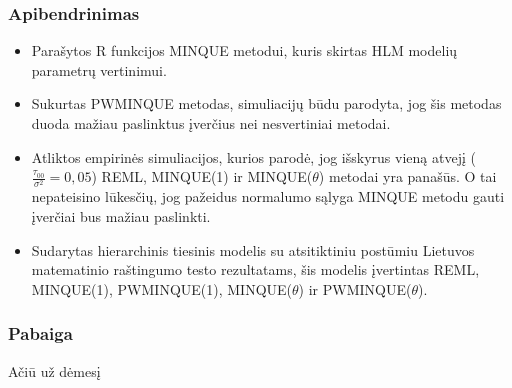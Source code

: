 \documentclass[utf8,hyperref={unicode,pdftex}]{beamer}
\begin{document}
\begin{frame}
\frametitle{Apibendrinimas}

\begin{itemize}
\item Parašytos R funkcijos MINQUE metodui, kuris skirtas HLM modelių parametrų vertinimui.
\item Sukurtas PWMINQUE metodas, simuliacijų būdu parodyta, jog šis metodas duoda mažiau paslinktus įverčius nei nesvertiniai metodai.
\item Atliktos empirinės simuliacijos, kurios parodė, jog išskyrus vieną atvejį ($\frac{\tau_{00}}{\sigma^2}=0,05$) REML, MINQUE(1) ir MINQUE($\theta$) metodai yra panašūs. O tai nepateisino lūkesčių, jog pažeidus normalumo sąlyga MINQUE metodu gauti įverčiai bus mažiau paslinkti.
\item Sudarytas hierarchinis tiesinis modelis su atsitiktiniu postūmiu Lietuvos matematinio raštingumo testo rezultatams, šis modelis įvertintas REML, MINQUE(1), PWMINQUE(1), MINQUE($\theta$) ir PWMINQUE($\theta$).
\end{itemize}

\end{frame}
\begin{frame}
\frametitle{Pabaiga}
\huge
Ačiū už dėmesį
\end{frame}
\end{document}
